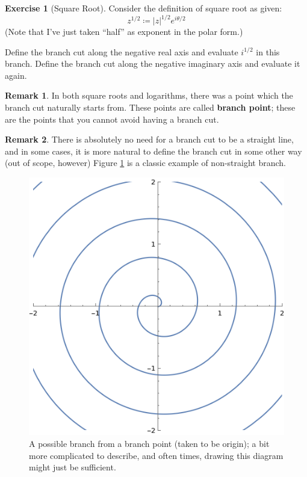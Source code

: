 \documentclass[a4paper, 12pt]{article}
\theoremstyle{definition}
\newtheorem{exercise}{Exercise}
\newtheorem{remark}{Remark}
\numberwithin{theorem}{section}
\numberwithin{definition}{section}
\numberwithin{exercise}{section}
\numberwithin{remark}{section}
\numberwithin{figure}{section}
\numberwithin{example}{section}
\begin{document}
\begin{exercise}[Square Root]
    Consider the definition of square root as given:
    \begin{equation*}
        z^{1/2} \coloneqq |z|^{1/2} e^{i \theta / 2}
    \end{equation*}
    (Note that I've just taken ``half'' as exponent in the polar form.)

    Define the branch cut along the negative real axis and evaluate $i^{1/2}$ in this branch.
    Define the branch cut along the negative imaginary axis and evaluate it again.
\end{exercise}
\begin{remark}
    In both square roots and logarithms, there was a point which the branch cut naturally starts from.
    These points are called \textbf{branch point};
    these are the points that you cannot avoid having a branch cut.
\end{remark}
\begin{remark}
    There is absolutely no need for a branch cut to be a straight line,
    and in some cases, it is more natural to define the branch cut in some other way (out of scope, however)
    Figure \ref{fig: spiral} is a classic example of non-straight branch.
    \begin{figure}[tbp]
        \centering
        \includegraphics[scale=0.6]{spiral}
        \caption{A possible branch from a branch point (taken to be origin); a bit more complicated to describe, and often times, drawing this diagram might just be sufficient.}
        \label{fig: spiral}
    \end{figure}
\end{remark}
\end{document}
